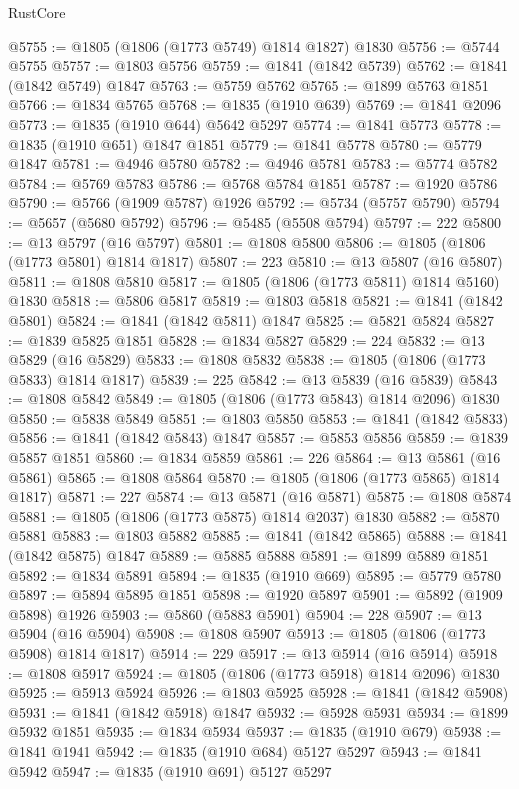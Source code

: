 \begin{lexlean}{RustCore}
\begin{coremodule}
@5755 := @1805 (@1806 (@1773 @5749) @1814 @1827) @1830
@5756 := @5744 @5755
@5757 := @1803 @5756
@5759 := @1841 (@1842 @5739)
@5762 := @1841 (@1842 @5749) @1847
@5763 := @5759 @5762
@5765 := @1899 @5763 @1851
@5766 := @1834 @5765
@5768 := @1835 (@1910 @639)
@5769 := @1841 @2096
@5773 := @1835 (@1910 @644) @5642 @5297
@5774 := @1841 @5773
@5778 := @1835 (@1910 @651) @1847 @1851
@5779 := @1841 @5778
@5780 := @5779 @1847
@5781 := @4946 @5780
@5782 := @4946 @5781
@5783 := @5774 @5782
@5784 := @5769 @5783
@5786 := @5768 @5784 @1851
@5787 := @1920 @5786
@5790 := @5766 (@1909 @5787) @1926
@5792 := @5734 (@5757 @5790)
@5794 := @5657 (@5680 @5792)
@5796 := @5485 (@5508 @5794)
@5797 := 222
@5800 := @13 @5797 (@16 @5797)
@5801 := @1808 @5800
@5806 := @1805 (@1806 (@1773 @5801) @1814 @1817)
@5807 := 223
@5810 := @13 @5807 (@16 @5807)
@5811 := @1808 @5810
@5817 := @1805 (@1806 (@1773 @5811) @1814 @5160) @1830
@5818 := @5806 @5817
@5819 := @1803 @5818
@5821 := @1841 (@1842 @5801)
@5824 := @1841 (@1842 @5811) @1847
@5825 := @5821 @5824
@5827 := @1839 @5825 @1851
@5828 := @1834 @5827
@5829 := 224
@5832 := @13 @5829 (@16 @5829)
@5833 := @1808 @5832
@5838 := @1805 (@1806 (@1773 @5833) @1814 @1817)
@5839 := 225
@5842 := @13 @5839 (@16 @5839)
@5843 := @1808 @5842
@5849 := @1805 (@1806 (@1773 @5843) @1814 @2096) @1830
@5850 := @5838 @5849
@5851 := @1803 @5850
@5853 := @1841 (@1842 @5833)
@5856 := @1841 (@1842 @5843) @1847
@5857 := @5853 @5856
@5859 := @1839 @5857 @1851
@5860 := @1834 @5859
@5861 := 226
@5864 := @13 @5861 (@16 @5861)
@5865 := @1808 @5864
@5870 := @1805 (@1806 (@1773 @5865) @1814 @1817)
@5871 := 227
@5874 := @13 @5871 (@16 @5871)
@5875 := @1808 @5874
@5881 := @1805 (@1806 (@1773 @5875) @1814 @2037) @1830
@5882 := @5870 @5881
@5883 := @1803 @5882
@5885 := @1841 (@1842 @5865)
@5888 := @1841 (@1842 @5875) @1847
@5889 := @5885 @5888
@5891 := @1899 @5889 @1851
@5892 := @1834 @5891
@5894 := @1835 (@1910 @669)
@5895 := @5779 @5780
@5897 := @5894 @5895 @1851
@5898 := @1920 @5897
@5901 := @5892 (@1909 @5898) @1926
@5903 := @5860 (@5883 @5901)
@5904 := 228
@5907 := @13 @5904 (@16 @5904)
@5908 := @1808 @5907
@5913 := @1805 (@1806 (@1773 @5908) @1814 @1817)
@5914 := 229
@5917 := @13 @5914 (@16 @5914)
@5918 := @1808 @5917
@5924 := @1805 (@1806 (@1773 @5918) @1814 @2096) @1830
@5925 := @5913 @5924
@5926 := @1803 @5925
@5928 := @1841 (@1842 @5908)
@5931 := @1841 (@1842 @5918) @1847
@5932 := @5928 @5931
@5934 := @1899 @5932 @1851
@5935 := @1834 @5934
@5937 := @1835 (@1910 @679)
@5938 := @1841 @1941
@5942 := @1835 (@1910 @684) @5127 @5297
@5943 := @1841 @5942
@5947 := @1835 (@1910 @691) @5127 @5297

\end{coremodule}
\end{lexlean}
